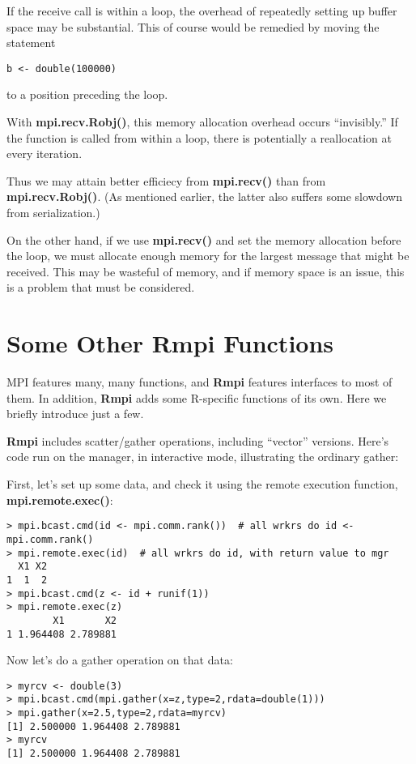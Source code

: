 If the receive call is within a loop, the overhead of repeatedly setting
up buffer space may be substantial.  This of course would be remedied by
moving the statement

\begin{lstlisting}
b <- double(100000)
\end{lstlisting}

to a position preceding the loop.

With {\bf mpi.recv.Robj()}, this memory allocation overhead occurs
``invisibly.''  If the function is called from within a loop, there
is potentially a reallocation at every iteration.

Thus we may attain better efficiecy from {\bf mpi.recv()} than from {\bf
mpi.recv.Robj()}.  (As mentioned earlier, the latter also suffers some
slowdown from serialization.)

On the other hand, if we use {\bf mpi.recv()} and set the memory
allocation before the loop, we must allocate enough memory for the
largest message that might be received.  This may be wasteful of memory,
and if memory space is an issue, this is a problem that must be
considered.

\section{Some Other Rmpi Functions}

MPI features many, many functions, and {\bf Rmpi} features interfaces to
most of them.  In addition, {\bf Rmpi} adds some R-specific functions of
its own.  Here we briefly introduce just a few.  

{\bf Rmpi} includes scatter/gather operations, including ``vector''
versions.  Here's code run on the manager, in interactive mode,
illustrating the ordinary gather:

First, let's set up some data, and check it using the remote execution
function, {\bf mpi.remote.exec()}:
\begin{lstlisting}
> mpi.bcast.cmd(id <- mpi.comm.rank())  # all wrkrs do id <- mpi.comm.rank()
> mpi.remote.exec(id)  # all wrkrs do id, with return value to mgr
  X1 X2
1  1  2
> mpi.bcast.cmd(z <- id + runif(1))
> mpi.remote.exec(z)
        X1       X2
1 1.964408 2.789881
\end{lstlisting}

Now let's do a gather operation on that data:

\begin{lstlisting}
> myrcv <- double(3)
> mpi.bcast.cmd(mpi.gather(x=z,type=2,rdata=double(1)))
> mpi.gather(x=2.5,type=2,rdata=myrcv)
[1] 2.500000 1.964408 2.789881
> myrcv
[1] 2.500000 1.964408 2.789881
\end{lstlisting}

